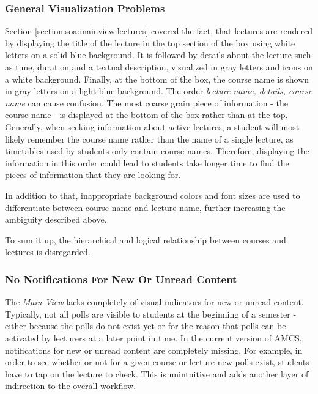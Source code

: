 \subsubsection{General Visualization Problems}
\label{section:con:problems:mainview:generalvis}
Section \ref{section:soa:mainview:lectures} covered the fact, that lectures are rendered by displaying the title of the lecture in the top section of the box using white letters on a solid blue background. It is followed by details about the lecture such as time, duration and a textual description, visualized in gray letters and icons on a white background. Finally, at the bottom of the box, the course name is shown in gray letters on a light blue background. The order \emph{lecture name, details, course name} can cause confusion.
The most coarse grain piece of information - the course name - is displayed at the bottom of the box rather than at the top. Generally, when seeking information about active lectures, a student will most likely remember the course name rather than the name of a single lecture, as timetables used by students only contain course names. Therefore, displaying the information in this order could lead to students take longer time to find the pieces of information that they are looking for.

In addition to that, inappropriate background colors and font sizes are used to differentiate between course name and lecture name, further increasing the ambiguity described above.


To sum it up, the hierarchical and logical relationship between courses and lectures is disregarded. 

\subsubsection{No Notifications For New Or Unread Content}
\label{section:con:problems:noindicators}
The \emph{Main View} lacks completely of visual indicators for new or unread content. Typically, not all polls are visible to students at the beginning of a semester - either because the polls do not exist yet or for the reason that polls can be activated by lecturers at a later point in time. In the current version of AMCS, notifications for new or unread content are completely missing. For example, in order to see whether or not for a given course or lecture new polls exist, students have to tap on the lecture to check. This is unintuitive and adds another layer of indirection to the overall workflow.

